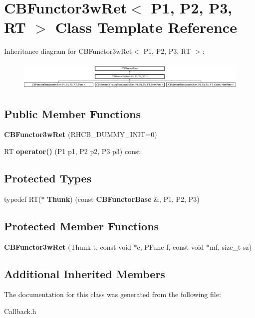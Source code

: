 \section{C\+B\+Functor3w\+Ret$<$ P1, P2, P3, RT $>$ Class Template Reference}
\label{classCBFunctor3wRet}
Inheritance diagram for C\+B\+Functor3w\+Ret$<$ P1, P2, P3, RT $>$\+:\begin{figure}[H]
\begin{center}
\leavevmode
\includegraphics[height=1.396509cm]{classCBFunctor3wRet}
\end{center}
\end{figure}
\subsection*{Public Member Functions}
\begin{DoxyCompactItemize}
\item 
{\bfseries C\+B\+Functor3w\+Ret} (R\+H\+C\+B\+\_\+\+D\+U\+M\+M\+Y\+\_\+\+I\+N\+IT=0)\label{classCBFunctor3wRet_a55a3f8a8ee1c4cc3d287e0998560fce7}

\item 
RT {\bfseries operator()} (P1 p1, P2 p2, P3 p3) const \label{classCBFunctor3wRet_a00518cbfceca05d2f590658dff0a9120}

\end{DoxyCompactItemize}
\subsection*{Protected Types}
\begin{DoxyCompactItemize}
\item 
typedef RT($\ast$ {\bfseries Thunk}) (const {\bf C\+B\+Functor\+Base} \&, P1, P2, P3)\label{classCBFunctor3wRet_aca2bfd8d5602ca752219aeca7686e783}

\end{DoxyCompactItemize}
\subsection*{Protected Member Functions}
\begin{DoxyCompactItemize}
\item 
{\bfseries C\+B\+Functor3w\+Ret} (Thunk t, const void $\ast$c, P\+Func f, const void $\ast$mf, size\+\_\+t sz)\label{classCBFunctor3wRet_ab7b68e0f6a7dd2e53055a3c1405ee329}

\end{DoxyCompactItemize}
\subsection*{Additional Inherited Members}


The documentation for this class was generated from the following file\+:\begin{DoxyCompactItemize}
\item 
Callback.\+h\end{DoxyCompactItemize}
